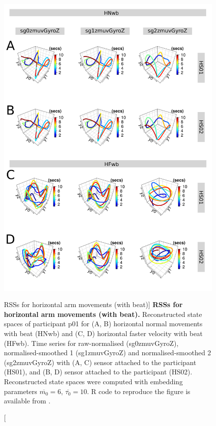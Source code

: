 \begin{figure}
\centering
\includegraphics[height=0.8\textheight]{fig_5_06}
\caption
	[RSSs for horizontal arm movements (with beat)]{
	{\bf RSSs for horizontal arm movements (with beat).}
	Reconstructed state spaces of participant p01 for 
	(A, B) horizontal normal movements with beat (HNwb) and 
	(C, D) horizontal faster velocity with beat (HFwb).
	Time series for raw-normalised (sg0zmuvGyroZ), 
	normalised-smoothed 1 (sg1zmuvGyroZ) and 
	normalised-smoothed 2 (sg2zmuvGyroZ) with
	(A, C) sensor attached to the participant (HS01), and
	(B, D) sensor attached to the participant (HS02).	
	Reconstructed state spaces were computed with 
	embedding parameters $\overline{m_0}=6$, $\overline{\tau_0}=10$.
	R code to reproduce the figure is available from \cite{xochicale2018}.
        }
     \label{fig:rss_Hwb_w500}
\end{figure}

